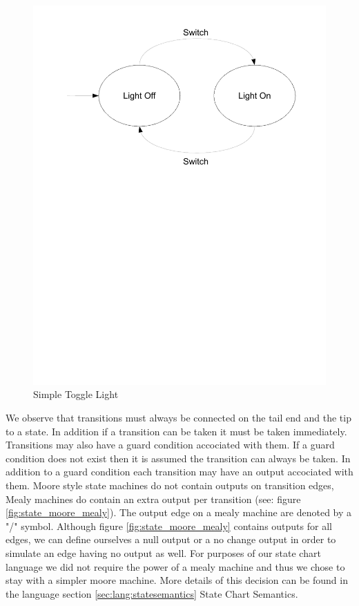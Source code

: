 \begin{figure}[htp]
    \centering
    \includegraphics[trim= 10mm 150mm 10mm 10mm, clip ,width=\imgmedium]{./images/state_blink_light.pdf}
    \caption{Simple Toggle Light}
    \label{fig:state_blink_light}
\end{figure}

We observe that transitions must always be connected on the tail end and the tip to a state. In addition if a transition can be taken it must be taken immediately. Transitions may also have a guard condition accociated with them. If a guard condition does not exist then it is assumed the transition can always be taken. In addition to a guard condition each transition may have an output accociated with them. Moore style state machines do not contain outputs on transition edges, Mealy machines do contain an extra output per transition (see: figure \ref{fig:state_moore_mealy}). The output edge on a mealy machine are denoted by a "/" symbol. Although figure \ref{fig:state_moore_mealy} contains outputs for all edges, we can define ourselves a null output or a no change output in order to simulate an edge having no output as well. For purposes of our state chart language we did not require the power of a mealy machine and thus we chose to stay with a simpler moore machine. More details of this decision can be found in the language section \ref{sec:lang:statesemantics} State Chart Semantics.

